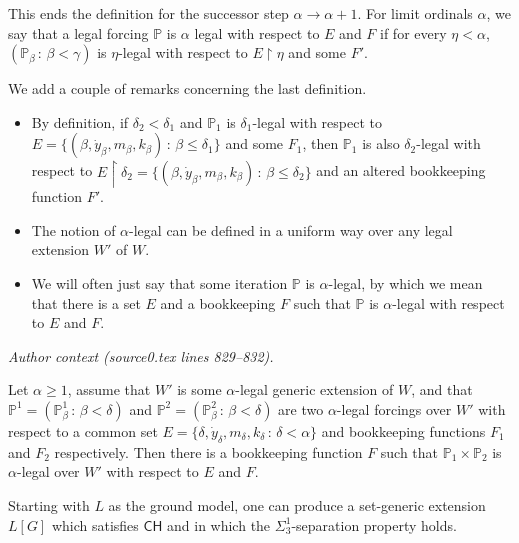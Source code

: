 \documentclass[10pt,a4paper]{amsart}
\newcommand{\CH}{\mathsf{CH}}
\newcommand{\forceP}{\mathbb{P}}
\begin{document}
This ends the definition for the successor step $\alpha \rightarrow \alpha+1$.
For limit ordinals $\alpha$, we say that a legal forcing $\forceP$ is $\alpha$ legal with respect to $E$ and $F$ if for every $\eta < \alpha$,
$(\forceP_{\beta} \,: \, \beta < \gamma)$ is $\eta$-legal with respect to $E \upharpoonright \eta$ and some $F'$.
\par \medskip

We add a couple of remarks concerning the last definition.
\begin{itemize}

\item By definition, if $\delta_2 < \delta_1$ and $\forceP_1$ is $\delta_1$-legal with respect to $E= \{(\beta, \dot{y}_{\beta}, m_{\beta} ,k_{\beta}) \, : \,  \beta \le \delta_1\}$ and some $F_1$, then  $\forceP_1$ is also $\delta_2$-legal with respect to $E \upharpoonright \delta_2 = \{(\beta, \dot{y}_{\beta}, m_{\beta} ,k_{\beta}) \, : \,  \beta \le \delta_2\}$ and an altered bookkeeping function $F'$.
 
\item The notion of $\alpha$-legal can be defined in a uniform way over any legal extension $W'$ of $W$.

\item We will often just say that some iteration $\forceP$ is $\alpha$-legal, by which we mean that there is a set $E$ and a bookkeeping $F$ such that $\forceP $ is $\alpha$-legal with respect to $E$ and $F$.
\end{itemize}
\par\medskip\noindent\textit{Author context (source0.tex lines 829--832).}\par\smallskip
\begin{lemma}\label{productlegal}
Let $\alpha \ge 1$, assume that $W'$ is some $\alpha$-legal generic extension of $W$, and that $\forceP^1=(\forceP^1_{\beta} \,: \,\beta < \delta)$ and $\forceP^2=(\forceP^2_{\beta} \,: \, \beta < \delta) $ are two $\alpha$-legal forcings over $W'$ with respect to a common set $E=\{\delta,\dot{y}_{\delta},m_{\delta}, k_{\delta} \,: \, \delta < \alpha\}$ and bookkeeping functions $F_1$ and $F_2$ respectively. 
Then there is a bookkeeping function $F$ such that $\forceP_1 \times \forceP_2$ is $\alpha$-legal over $W'$ with respect to $E$ and $F$.
\end{lemma}

\begin{theorem}
Starting with $L$ as the ground model, one can produce a set-generic extension $L[G]$ which satisfies $\CH$ and in which the ${\Sigma^1_3}$-separation property holds.
\end{theorem}
\end{document}
